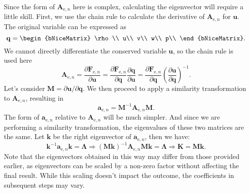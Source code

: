 \documentclass{develop-note}
\begin{document}
Since the form of $\mathbf{A}_{\mathrm{e},n}$ here is complex, calculating the eigenvector will require a little skill. First, we use the chain rule to calculate the derivative of $\mathbf{A}_{\mathrm{e},n}$ for $\mathbf{u}$. The original variable can be expressed as
\begin{equation}
  \mathbf{q}=\begin{bNiceMatrix}
    \rho\\
    u\\
    v\\
    w\\
    p\\
  \end{bNiceMatrix}.
\end{equation}
We cannot directly differentiate the conserved variable $\mathbf{u}$, so the chain rule is used here
\begin{equation}
  \mathbf{A}_{\mathrm{e},n}=\dfrac{\partial\mathbf{F}_{\mathrm{e},n}}{\partial\mathbf{u}}=\dfrac{\partial\mathbf{F}_{\mathrm{e},n}}{\partial\mathbf{q}}\dfrac{\partial\mathbf{q}}{\partial\mathbf{u}}=\dfrac{\partial\mathbf{F}_{\mathrm{e},n}}{\partial\mathbf{q}}\left(\dfrac{\partial\mathbf{u}}{\partial\mathbf{q}}\right)^{-1}.
\end{equation}
Let's consider $\mathbf{M}=\partial\mathbf{u}/\partial\mathbf{q}$. We then proceed to apply a similarity transformation to $\mathbf{A}_{\mathrm{e},n}$, resulting in
\begin{equation}
  \mathbf{a}_{\mathrm{e},n}=\mathbf{M}^{-1}\mathbf{A}_{\mathrm{e},n}\mathbf{M}.
\end{equation}
The form of $\mathbf{a}_{\mathrm{e},n}$ relative to $\mathbf{A}_{\mathrm{e},n}$ will be much simpler. And since we are performing a similarity transformation, the eigenvalues of these two matrices are the same. Let $\mathbf{k}$ be the right eigenvector of $\mathbf{a}_{\mathrm{e},n}$, then we have:
\begin{equation}
  \mathbf{k}^{-1}\mathbf{a}_{\mathrm{e},n}\mathbf{k}=\mathbf{\Lambda}\Rightarrow(\mathbf{M}\mathbf{k})^{-1}\mathbf{A}_{\mathrm{e},n}\mathbf{M}\mathbf{k}=\mathbf{\Lambda}\Rightarrow\mathbf{K}=\mathbf{M k}.
\end{equation}
Note that the eigenvectors obtained in this way may differ from those provided earlier, as eigenvectors can be scaled by a non-zero factor without affecting the final result. While this scaling doesn't impact the outcome, the coefficients in subsequent steps may vary.
\end{document}

